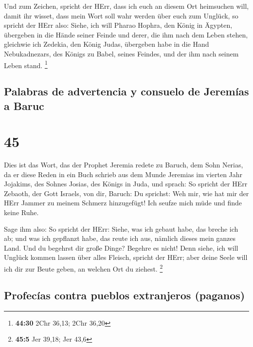  Und zum Zeichen, spricht der HErr, dass ich euch an
diesem Ort heimsuchen will, damit ihr wisset, dass mein Wort soll wahr
werden über euch zum Unglück,  so spricht der HErr also:
Siehe, ich will Pharao Hophra, den König in Ägypten, übergeben in die
Hände seiner Feinde und derer, die ihm nach dem Leben stehen, gleichwie
ich Zedekia, den König Judas, übergeben habe in die Hand Nebukadnezars,
des Königs zu Babel, seines Feindes, und der ihm nach seinem Leben
stand. \footnote{\textbf{44:30} 2Chr 36,13; 2Chr 36,20}

\hypertarget{palabras-de-advertencia-y-consuelo-de-jeremuxedas-a-baruc}{%
\subsection{Palabras de advertencia y consuelo de Jeremías a
Baruc}\label{palabras-de-advertencia-y-consuelo-de-jeremuxedas-a-baruc}}

\hypertarget{section-44}{%
\section{45}\label{section-44}}

 Dies ist das Wort, das der Prophet Jeremia redete zu
Baruch, dem Sohn Nerias, da er diese Reden in ein Buch schrieb aus dem
Munde Jeremias im vierten Jahr Jojakims, des Sohnes Josias, des Königs
in Juda, und sprach:  So spricht der HErr Zebaoth, der
Gott Israels, von dir, Baruch:  Du sprichst: Weh mir, wie
hat mir der HErr Jammer zu meinem Schmerz hinzugefügt! Ich seufze mich
müde und finde keine Ruhe.

 Sage ihm also: So spricht der HErr: Siehe, was ich gebaut
habe, das breche ich ab; und was ich gepflanzt habe, das reute ich aus,
nämlich dieses mein ganzes Land.  Und du begehrst dir
große Dinge? Begehre es nicht! Denn siehe, ich will Unglück kommen
lassen über alles Fleisch, spricht der HErr; aber deine Seele will ich
dir zur Beute geben, an welchen Ort du ziehest. \footnote{\textbf{45:5}
  Jer 39,18; Jer 43,6}

\hypertarget{profecuxedas-contra-pueblos-extranjeros-paganos}{%
\subsection{Profecías contra pueblos extranjeros
(paganos)}\label{profecuxedas-contra-pueblos-extranjeros-paganos}}

